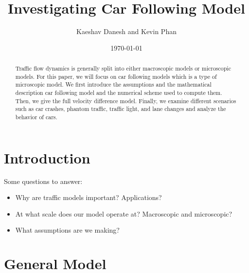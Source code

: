 \documentclass[12pt]{article}
\title{Investigating Car Following Model}
\author{Kaeshav Danesh and Kevin Phan}
\date{\today}
\begin{document}
    \maketitle

    \begin{abstract}
        Traffic flow dynamics is generally split into either macroscopic models or microscopic models. For this paper, we will focus on car following models which is a type of microscopic model. We first introduce the assumptions and the mathematical description car following model and the numerical scheme used to compute them. Then, we give the full velocity difference model. Finally, we examine different scenarios such as car crashes, phantom traffic, traffic light, and lane changes and analyze the behavior of cars. 
    \end{abstract}

    \newpage

    \tableofcontents

    \newpage

    \section{Introduction}
    
    Some questions to answer:
    \begin{itemize}
        \item Why are traffic models important? Applications?
        \item At what scale does our model operate at? Macroscopic and microscopic?  
        \item What assumptions are we making? 
    \end{itemize}

    \section{General Model}
\end{document}
